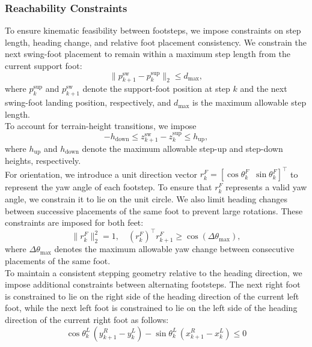 \documentclass[letterpaper, 10 pt, journal, twoside]{IEEEtran}
\begin{document}
\subsubsection{Reachability Constraints}
To ensure kinematic feasibility between footsteps, we impose constraints on step length, heading change, and relative foot placement consistency.
We constrain the next swing-foot placement to remain within a maximum step length from the current support foot:
\begin{equation}
    \|p_{k+1}^{\mathrm{sw}} - p_k^{\mathrm{sup}}\|_2 \le d_{\max},
\label{eq:convex}
\end{equation}
\noindent where $p_k^{\mathrm{sup}}$ and $p_{k+1}^{\mathrm{sw}}$ denote the support-foot position at step $k$ and the next swing-foot landing position, respectively, and $d_{\max}$ is the maximum allowable step length.
\\
\indent
To account for terrain-height transitions, we impose
\begin{equation}
-h_{\mathrm{down}}
\le z_{k+1}^{\mathrm{sw}}-z_k^{\mathrm{sup}}
\le h_{\mathrm{up}},
\label{eq:vertical_reachability}
\end{equation}
where $h_{\mathrm{up}}$ and $h_{\mathrm{down}}$ denote the maximum allowable step-up and step-down heights, respectively.
\\
\indent
For orientation, we introduce a unit direction vector $r_k^F = [\cos\theta_k^F\;\; \sin\theta_k^F]^\top$ to represent the yaw angle of each footstep.
To ensure that $r_k^F$ represents a valid yaw angle, we constrain it to lie on the unit circle.
We also limit heading changes between successive placements of the same foot to prevent large rotations.
These constraints are imposed for both feet:
\begin{equation}
    \|r_k^F\|_2^2 = 1,\quad (r_k^F)^\top r_{k+1}^F \ge \cos(\Delta\theta_{\max}),
\label{eq:nonconvex_1}
\end{equation}
\noindent where $\Delta\theta_{\max}$ denotes the maximum allowable yaw change between consecutive placements of the same foot.
\\
\indent
To maintain a consistent stepping geometry relative to the heading direction, we impose additional constraints between alternating footsteps.
The next right foot is constrained to lie on the right side of the heading direction of the current left foot, while the next left foot is constrained to lie on the left side of the heading direction of the current right foot as follows:
\begin{equation}
    \cos\theta_k^{L}\,(y_{k+1}^{R} - y_k^{L}) - \sin\theta_k^{L}\,(x_{k+1}^{R} - x_k^{L}) \le 0
\label{eq:nonconvex_3}
\end{equation}
\end{document}
